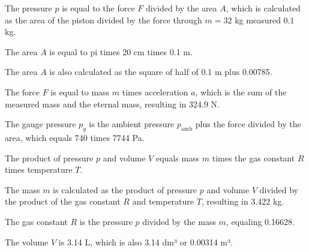 The pressure \( p \) is equal to the force \( F \) divided by the area \( A \), which is calculated as the area of the piston divided by the force through \( m = 32 \) kg measured \( 0.1 \) kg.

The area \( A \) is equal to pi times 20 cm times 0.1 m.

The area \( A \) is also calculated as the square of half of 0.1 m plus 0.00785.

The force \( F \) is equal to mass \( m \) times acceleration \( a \), which is the sum of the measured mass and the eternal mass, resulting in 324.9 N.

The gauge pressure \( p_g \) is the ambient pressure \( p_{\text{amb}} \) plus the force divided by the area, which equals 740 times 7744 Pa.

The product of pressure \( p \) and volume \( V \) equals mass \( m \) times the gas constant \( R \) times temperature \( T \).

The mass \( m \) is calculated as the product of pressure \( p \) and volume \( V \) divided by the product of the gas constant \( R \) and temperature \( T \), resulting in 3.422 kg.

The gas constant \( R \) is the pressure \( p \) divided by the mass \( m \), equaling 0.16628.

The volume \( V \) is 3.14 L, which is also 3.14 dm³ or 0.00314 m³.